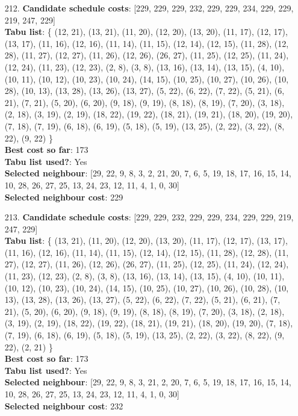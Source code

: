 \documentclass[fleqn]{article}
\begin{document}
\begin{itemize}
    \item[212.] \textbf{Candidate schedule costs}: [229, 229, 229, 232, 229, 229, 234, 229, 229, 219, 247, 229] \\
    \textbf{Tabu list}: \{ (12, 21), (13, 21), (11, 20), (12, 20), (13, 20), (11, 17), (12, 17), (13, 17), (11, 16), (12, 16), (11, 14), (11, 15), (12, 14), (12, 15), (11, 28), (12, 28), (11, 27), (12, 27), (11, 26), (12, 26), (26, 27), (11, 25), (12, 25), (11, 24), (12, 24), (11, 23), (12, 23), (2, 8), (3, 8), (13, 16), (13, 14), (13, 15), (4, 10), (10, 11), (10, 12), (10, 23), (10, 24), (14, 15), (10, 25), (10, 27), (10, 26), (10, 28), (10, 13), (13, 28), (13, 26), (13, 27), (5, 22), (6, 22), (7, 22), (5, 21), (6, 21), (7, 21), (5, 20), (6, 20), (9, 18), (9, 19), (8, 18), (8, 19), (7, 20), (3, 18), (2, 18), (3, 19), (2, 19), (18, 22), (19, 22), (18, 21), (19, 21), (18, 20), (19, 20), (7, 18), (7, 19), (6, 18), (6, 19), (5, 18), (5, 19), (13, 25), (2, 22), (3, 22), (8, 22), (9, 22) \} \\
    \textbf{Best cost so far}: 173 \\
    \textbf{Tabu list used?}: Yes \\
    \textbf{Selected neighbour}: [29, 22, 9, 8, 3, 2, 21, 20, 7, 6, 5, 19, 18, 17, 16, 15, 14, 10, 28, 26, 27, 25, 13, 24, 23, 12, 11, 4, 1, 0, 30] \\
    \textbf{Selected neighbour cost}: 229
      

    \item[213.] \textbf{Candidate schedule costs}: [229, 229, 232, 229, 229, 234, 229, 229, 219, 247, 229] \\
    \textbf{Tabu list}: \{ (13, 21), (11, 20), (12, 20), (13, 20), (11, 17), (12, 17), (13, 17), (11, 16), (12, 16), (11, 14), (11, 15), (12, 14), (12, 15), (11, 28), (12, 28), (11, 27), (12, 27), (11, 26), (12, 26), (26, 27), (11, 25), (12, 25), (11, 24), (12, 24), (11, 23), (12, 23), (2, 8), (3, 8), (13, 16), (13, 14), (13, 15), (4, 10), (10, 11), (10, 12), (10, 23), (10, 24), (14, 15), (10, 25), (10, 27), (10, 26), (10, 28), (10, 13), (13, 28), (13, 26), (13, 27), (5, 22), (6, 22), (7, 22), (5, 21), (6, 21), (7, 21), (5, 20), (6, 20), (9, 18), (9, 19), (8, 18), (8, 19), (7, 20), (3, 18), (2, 18), (3, 19), (2, 19), (18, 22), (19, 22), (18, 21), (19, 21), (18, 20), (19, 20), (7, 18), (7, 19), (6, 18), (6, 19), (5, 18), (5, 19), (13, 25), (2, 22), (3, 22), (8, 22), (9, 22), (2, 21) \} \\
    \textbf{Best cost so far}: 173 \\
    \textbf{Tabu list used?}: Yes \\
    \textbf{Selected neighbour}: [29, 22, 9, 8, 3, 21, 2, 20, 7, 6, 5, 19, 18, 17, 16, 15, 14, 10, 28, 26, 27, 25, 13, 24, 23, 12, 11, 4, 1, 0, 30] \\
    \textbf{Selected neighbour cost}: 232
      


\end{itemize}
\end{document}
